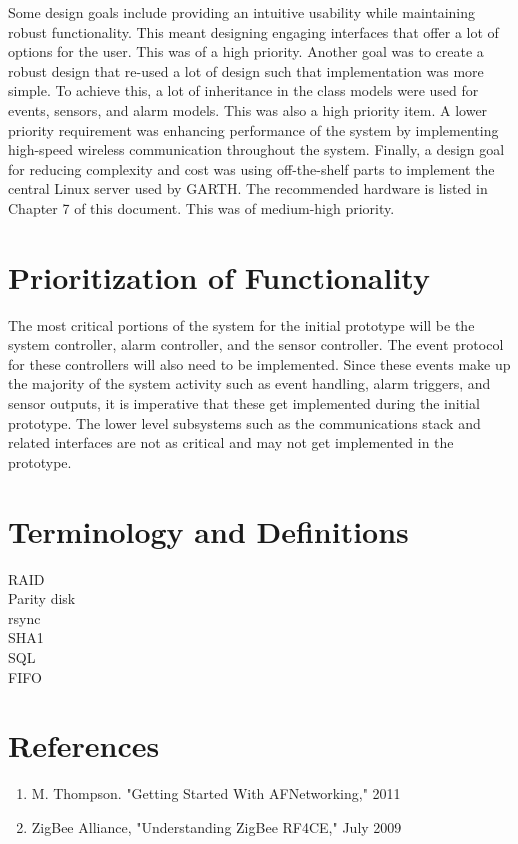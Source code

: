 \documentclass{report}
\begin{document}
Some design goals include providing an intuitive usability while maintaining
robust functionality. This meant designing engaging interfaces that offer a lot
of options for the user. This was of a high priority. Another goal was to create
a robust design that re-used a lot of design such that implementation was more
simple. To achieve this, a lot of inheritance in the class models were used for
events, sensors, and alarm models. This was also a high priority item. A lower
priority requirement was enhancing performance of the system by implementing
high-speed wireless communication throughout the system. Finally, a design goal
for reducing complexity and cost was using off-the-shelf parts to implement the
central Linux server used by GARTH. The recommended hardware is listed in 
Chapter 7 of this document. This was of medium-high priority.

\section{Prioritization of Functionality}

The most critical portions of the system for the initial prototype will be the 
system controller, alarm controller, and the sensor controller. The event 
protocol for these controllers will also need to be implemented. Since these
events make up the majority of the system activity such as event handling,
alarm triggers, and sensor outputs, it is imperative that these get implemented
during the initial prototype. The lower level subsystems such as the
communications stack and related interfaces are not as critical and may not
get implemented in the prototype.

\section{Terminology and Definitions}
\begin{description}
\item[RAID]
\item[Parity disk]
\item[rsync]
\item[SHA1]
\item[SQL]
\item[FIFO]
\end{description}

\section{References}

\begin{enumerate}
    \item M. Thompson. "Getting Started With AFNetworking," 2011
    \item ZigBee Alliance, "Understanding ZigBee RF4CE," July 2009
\end{enumerate}
%
\end{document}
